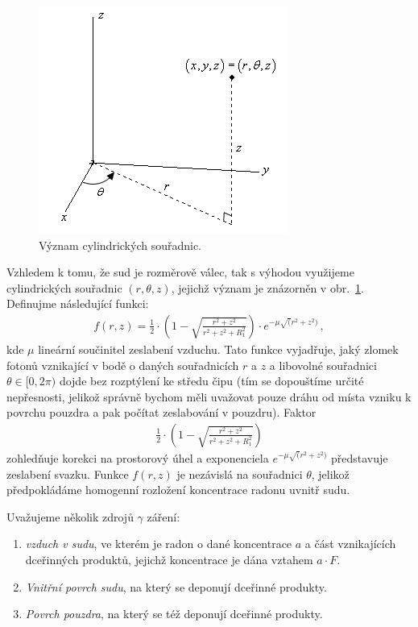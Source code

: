 \documentclass[11pt,a4paper]{article}
\begin{document}
\begin{figure}[ht]
	\centering
	\includegraphics[width=0.4\linewidth]{valcove_souradnice.png}
	\caption{Význam cylindrických souřadnic. \cite{valcovesouradnice}}
	\label{fig:valcovesouradnice}
\end{figure}
Vzhledem k tomu, že sud je rozměrově válec, tak s výhodou využijeme cylindrických souřadnic $(r,\theta, z)$, jejichž význam je znázorněn v obr.~\ref{fig:valcovesouradnice}. 
Definujme následující funkci:
\begin{align}
	f(r,z)=\frac{1}{2}\cdot\left(1-\sqrt{\frac{r^2+z^2}{r^2+z^2+R_1^2}}\right)\cdot e^{-\mu\sqrt(r^2+z^2)}\,,\label{eq:gama_geometrie}
\end{align}
kde $\mu$ lineární součinitel zeslabení vzduchu. Tato funkce vyjadřuje, jaký zlomek fotonů vznikající v bodě o daných souřadnicích $r$ a $z$ a libovolné souřadnici $\theta\in[0,2\pi)$ dojde bez rozptýlení ke středu čipu (tím se dopouštíme určité nepřesnosti, jelikož správně bychom měli uvažovat pouze dráhu od místa vzniku k povrchu pouzdra a pak počítat zeslabování v pouzdru). Faktor 
\begin{align}
	\frac{1}{2}\cdot\left(1-\sqrt{\frac{r^2+z^2}{r^2+z^2+R_1^2}}\right)
\end{align}
zohledňuje korekci na prostorový úhel a exponenciela $e^{-\mu\sqrt(r^2+z^2)}$ představuje zeslabení svazku. Funkce $f(r,z)$ je nezávislá na souřadnici $\theta$, jelikož předpokládáme homogenní rozložení koncentrace radonu uvnitř sudu.

Uvažujeme několik zdrojů $\gamma$ záření:
\begin{enumerate}
	\item \emph{vzduch v sudu}, ve kterém je radon o dané koncentrace $a$ a část vznikajících dceřinných produktů, jejichž koncentrace je dána vztahem $a\cdot F$.
	\item \emph{Vnitřní povrch sudu}, na který se deponují dceřinné produkty.
	\item \emph{Povrch pouzdra}, na který se též deponují dceřinné produkty.
	
\end{enumerate}
\end{document}
